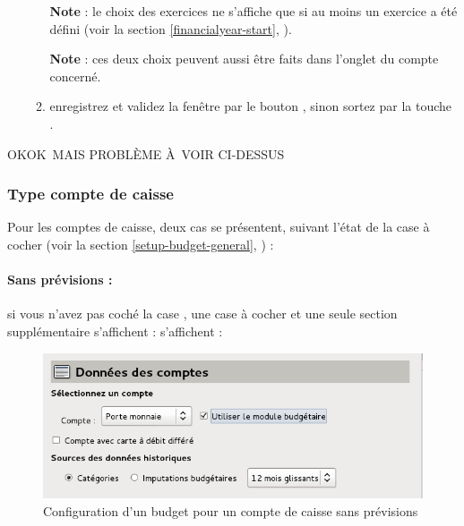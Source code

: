 \begin{enumerate}
\begin{enumerate}
			\textbf{Note} : le choix des exercices ne s'affiche que si au moins un exercice a été défini (voir la section \vref{financialyear-start}, ). %
			
			\textbf{Note} : ces deux choix peuvent aussi être faits dans l'onglet  du compte concerné.
			\item enregistrez et validez la fenêtre par le bouton , sinon sortez par la touche .	
		\end{enumerate}
\end{enumerate}

OKOK MAIS PROBLÈME À VOIR CI-DESSUS


\subsubsection{Type compte de caisse\label{setup-budget-data-cash}}

Pour les comptes de caisse, deux cas se présentent, suivant l'état de la case à cocher  (voir la section \vref{setup-budget-general}, ) :

\paragraph{Sans prévisions :} si vous n'avez pas coché la case , une case à cocher et une seule section supplémentaire \ifIllustration s'affichent :
\else s'affichent : 
\fi

\ifIllustration
\begin{figure}[ht]
\begin{center}
\includegraphics[scale=0.5]{image/screenshot/setup_budget_dataCash}
\end{center}
\caption{Configuration d'un budget pour un compte de caisse sans prévisions}
\label{setup_budget_dataCash-img}
\end{figure}
\fi

